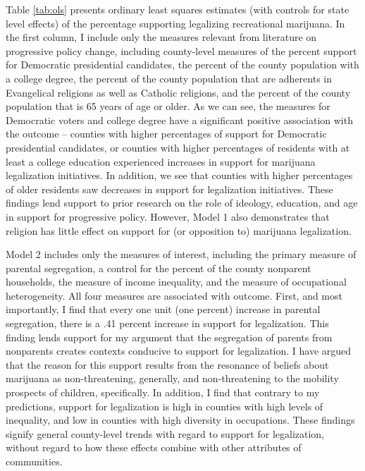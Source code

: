 Table \ref{tab:ols} presents ordinary least squares estimates (with controls for state level effects) of the percentage supporting legalizing recreational marijuana. In the first column, I include only the measures relevant from literature on progressive policy change, including county-level measures of the percent support for Democratic presidential candidates, the percent of the county population with a college degree, the percent of the county population that are adherents in Evangelical religions as well as Catholic religions, and the percent of the county population that is 65 years of age or older. As we can see, the measures for Democratic voters and college degree have a significant positive association with the outcome -- counties with higher percentages of support for Democratic presidential candidates, or counties with higher percentages of residents with at least a college education experienced increases in support for marijuana legalization initiatives. In addition, we see that counties with higher percentages of older residents saw decreases in support for legalization initiatives. These findings lend support to prior research on the role of ideology, education, and age in support for progressive policy. However, Model 1 also demonstrates that religion has little effect on support for (or opposition to) marijuana legalization. 




Model 2 includes only the measures of interest, including the primary measure of parental segregation, a control for the percent of the county nonparent households, the measure of income inequality, and the measure of occupational heterogeneity. All four measures are associated with outcome. First, and most importantly, I find that every one unit (one percent) increase in parental segregation, there is a .41 percent increase in support for legalization. This finding lends support for my argument that the segregation of parents from nonparents creates contexts conducive to support for legalization. I have argued that the reason for this support results from the resonance of beliefs about marijuana as non-threatening, generally, and non-threatening to the mobility prospects of children, specifically. In addition, I find that contrary to my predictions, support for legalization is high in counties with high levels of inequality, and low in counties with high diversity in occupations. These findings signify general county-level trends with regard to support for legalization, without regard to how these effects combine with other attributes of communities. 

